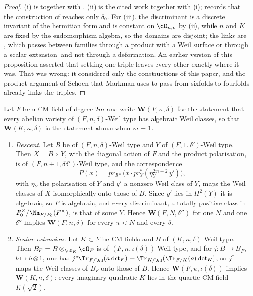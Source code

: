\begin{proof}
(i) is  together with . (ii) is the
cited work together with (i); 
records that the construction of  reaches only $\delta_{0}$.
For (iii), the discriminant is a discrete invariant of the hermitian form and
is constant on $\cD_{n,n}$ by (ii), while $n$ and $K$ are
fixed by the endomorphism algebra, so the domains are disjoint; the links are
, which passes between families through a product with a
Weil surface or through a scalar extension, and not through a deformation.
An earlier version of this proposition asserted that settling one triple
leaves every other exactly where it was. That was wrong: it considered only
the constructions of this paper, and the product argument of Schoen that
Markman uses to pass from sixfolds to fourfolds already links the triples.
\end{proof}
\begin{proposition}\label{prop:descent}
Let $F$ be a CM field of degree $2m$ and write $\mathbf{W}(F,n,\delta)$ for
the statement that every abelian variety of $(F,n,\delta)$-Weil type has
algebraic Weil classes, so that $\mathbf{W}(K,n,\delta)$ is the statement
above when $m=1$.
\begin{enumerate}[label=\textup{(\roman*)},leftmargin=2.6em]
\item \emph{Descent.} Let $B$ be of $(F,n,\delta)$-Weil type and $Y$ of
  $(F,1,\delta')$-Weil type. Then $X=B\times Y$, with the diagonal action of
  $F$ and the product polarisation, is of $(F,n+1,\delta\delta')$-Weil type,
  and the correspondence
  \[
    P(x)=pr_{B*}\bigl(x\cdot pr_{Y}^{*}(\eta_{Y}^{2m-2}\,y')\bigr),
  \]
  with $\eta_{Y}$ the polarisation of $Y$ and $y'$ a nonzero Weil class of
  $Y$, maps the Weil classes of $X$ isomorphically onto those of $B$. Since
  $y'$ lies in $H^{2}(Y)$ it is algebraic, so $P$ is algebraic, and every
  discriminant, a totally positive class in
  $F_{0}^{\times}/\Nm_{F/F_{0}}(F^{\times})$, is that of some $Y$.
  Hence $\mathbf{W}(F,N,\delta'')$ for one $N$ and one $\delta''$ implies
  $\mathbf{W}(F,n,\delta)$ for every $n<N$ and every $\delta$.
\item \emph{Scalar extension.} Let $K\subset F$ be CM fields and $B$ of
  $(K,n,\delta)$-Weil type. Then $B_{F}=B\otimes_{\cO_{K}}\cO_{F}$ is of
  $(F,n,\iota(\delta))$-Weil type, and for $j\colon B\to B_{F}$,
  $b\mapsto b\otimes1$, one has
  $j^{*}\Tr_{F/\QQ}(a\det_{F})=\Tr_{K/\QQ}(\Tr_{F/K}(a)\det_{K})$, so $j^{*}$
  maps the Weil classes of $B_{F}$ onto those of $B$. Hence
  $\mathbf{W}(F,n,\iota(\delta))$ implies $\mathbf{W}(K,n,\delta)$; every
  imaginary quadratic $K$ lies in the quartic CM field $K(\sqrt2)$.
\end{enumerate}
\end{proposition}

